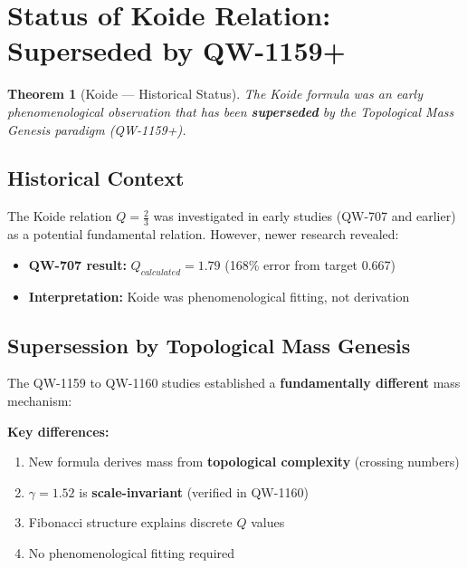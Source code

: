 \documentclass[11pt, a4paper]{article}
\newtheorem{theorem}{Theorem}[section]
\theoremstyle{remark}
\begin{document}
\section{Status of Koide Relation: Superseded by QW-1159+}

\begin{theorem}[Koide --- Historical Status]
The Koide formula was an early phenomenological observation that has been \textbf{superseded} by the Topological Mass Genesis paradigm (QW-1159+).
\end{theorem}

\subsection{Historical Context}

The Koide relation $Q = \frac{2}{3}$ was investigated in early studies (QW-707 and earlier) as a potential fundamental relation. However, newer research revealed:

\begin{itemize}
    \item \textbf{QW-707 result:} $Q_{calculated} = 1.79$ (168\% error from target 0.667)
    \item \textbf{Interpretation:} Koide was phenomenological fitting, not derivation
\end{itemize}

\subsection{Supersession by Topological Mass Genesis}

The QW-1159 to QW-1160 studies established a \textbf{fundamentally different} mass mechanism:

\begin{center}
\end{center}

\textbf{Key differences:}
\begin{enumerate}
    \item New formula derives mass from \textbf{topological complexity} (crossing numbers)
    \item $\gamma = 1.52$ is \textbf{scale-invariant} (verified in QW-1160)
    \item Fibonacci structure explains discrete $Q$ values
    \item No phenomenological fitting required
\end{enumerate}
\end{document}
